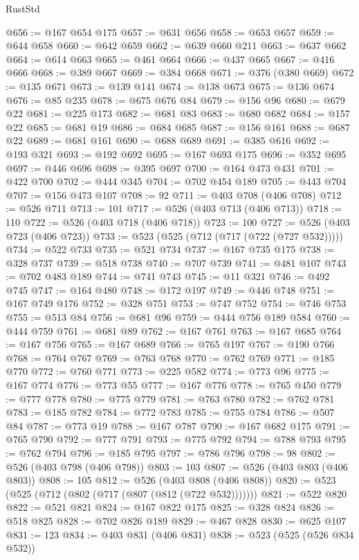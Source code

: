 \begin{lexlean}{RustStd}
\begin{coremodule}
{\begin{coremodule}
{{{{{{{{{{{{{{{{{{{{{{{{{{{{{{{{{{@656 := @167 @654 @175
@657 := @631 @656
@658 := @653 @657
@659 := @644 @658
@660 := @642 @659
@662 := @639 @660 @211
@663 := @637 @662
@664 := @614 @663
@665 := @461 @664
@666 := @437 @665
@667 := @416 @666
@668 := @389 @667
@669 := @384 @668
@671 := @376 (@380 @669)
@672 := @135 @671
@673 := @139 @141
@674 := @138 @673
@675 := @136 @674
@676 := @85 @235
@678 := @675 @676 @84
@679 := @156 @96
@680 := @679 @22
@681 := @225 @173
@682 := @681 @83
@683 := @680 @682
@684 := @157 @22
@685 := @681 @19
@686 := @684 @685
@687 := @156 @161
@688 := @687 @22
@689 := @681 @161
@690 := @688 @689
@691 := @385 @616
@692 := @193 @321
@693 := @192 @692
@695 := @167 @693 @175
@696 := @352 @695
@697 := @446 @696
@698 := @395 @697
@700 := @164 @473 @431
@701 := @422 @700
@702 := @444 @345
@704 := @702 @454 @189
@705 := @443 @704
@707 := @156 @473 @107
@708 := 92
@711 := @403 @708 (@406 @708)
@712 := @526 @711
@713 := 101
@717 := @526 (@403 @713 (@406 @713))
@718 := 110
@722 := @526 (@403 @718 (@406 @718))
@723 := 100
@727 := @526 (@403 @723 (@406 @723))
@733 := @523 (@525 (@712 (@717 (@722 (@727 @532)))))
@734 := @522 @733
@735 := @521 @734
@737 := @167 @735 @175
@738 := @328 @737
@739 := @518 @738
@740 := @707 @739
@741 := @481 @107
@743 := @702 @483 @189
@744 := @741 @743
@745 := @11 @321
@746 := @492 @745
@747 := @164 @480
@748 := @172 @197
@749 := @446 @748
@751 := @167 @749 @176
@752 := @328 @751
@753 := @747 @752
@754 := @746 @753
@755 := @513 @84
@756 := @681 @96
@759 := @444 @756 @189 @584
@760 := @444 @759
@761 := @681 @89
@762 := @167 @761
@763 := @167 @685
@764 := @167 @756
@765 := @167 @689
@766 := @765 @197
@767 := @190 @766
@768 := @764 @767
@769 := @763 @768
@770 := @762 @769
@771 := @185 @770
@772 := @760 @771
@773 := @225 @582
@774 := @773 @96
@775 := @167 @774
@776 := @773 @55
@777 := @167 @776
@778 := @765 @450
@779 := @777 @778
@780 := @775 @779
@781 := @763 @780
@782 := @762 @781
@783 := @185 @782
@784 := @772 @783
@785 := @755 @784
@786 := @507 @84
@787 := @773 @19
@788 := @167 @787
@790 := @167 @682 @175
@791 := @765 @790
@792 := @777 @791
@793 := @775 @792
@794 := @788 @793
@795 := @762 @794
@796 := @185 @795
@797 := @786 @796
@798 := 98
@802 := @526 (@403 @798 (@406 @798))
@803 := 103
@807 := @526 (@403 @803 (@406 @803))
@808 := 105
@812 := @526 (@403 @808 (@406 @808))
@820 := @523 (@525 (@712 (@802 (@717 (@807 (@812 (@722 @532)))))))
@821 := @522 @820
@822 := @521 @821
@824 := @167 @822 @175
@825 := @328 @824
@826 := @518 @825
@828 := @702 @826 @189
@829 := @467 @828
@830 := @625 @107
@831 := 123
@834 := @403 @831 (@406 @831)
@838 := @523 (@525 (@526 @834 @532))
}}}}}}}}}}}}}}}}}}}}}}}}}}}}}}}}}}
\end{coremodule}}
\end{coremodule}
\end{lexlean}

